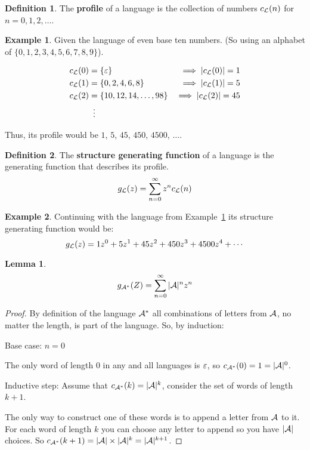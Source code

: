 \documentclass[a4paper]{article}
\newtheorem{lemma}{Lemma}[section]
\theoremstyle{definition}
\newtheorem{definition}{Definition}[section]
\theoremstyle{definition}
\newtheorem{example}{Example}[section]
\theoremstyle{definition}
\begin{document}
\begin{definition}
    The \textbf{profile} of a language is the collection of numbers $c_{\mathcal{L}}(n)$ for $n = 0,1,2,\dots$.
\end{definition}

\begin{example}
    \label{exmp:langProf}
    Given the language of even base ten numbers. (So using an alphabet of \(\{0, 1, 2, 3, 4, 5, 6, 7, 8, 9\}\)).
    
    \begin{align*}
        c_{\mathcal{L}}(0) &= \{ \varepsilon \} &\implies |c_{\mathcal{L}}(0)| = 1 \\
        c_{\mathcal{L}}(1) &= \{ 0, 2, 4, 6, 8 \} &\implies |c_{\mathcal{L}}(1)| = 5 \\
        c_{\mathcal{L}}(2) &= \{ 10, 12, 14, \dots, 98 \} &\implies |c_{\mathcal{L}}(2)| = 45 \\
        &~\,\vdots
    \end{align*}

    Thus, its profile would be \(1\), \(5\), \(45\), \(450\), \(4500\), \(\dots\).
\end{example}

\begin{definition}
    The \textbf{structure generating function} of a language is the generating function that describes its profile.
    \[
    g_{\mathcal{L}}(z) = \sum_{n=0}^\infty z^n c_{\mathcal{L}}(n)
    \]
\end{definition}

\begin{example}
    Continuing with the language from Example~\ref{exmp:langProf} its structure generating function would be:
    \[
    g_{\mathcal{L}}(z) = 1z^0 + 5z^1 + 45z^2 + 450z^3 + 4500z^4 + \cdots
    \]
\end{example}

\begin{lemma}
    \label{lem:genFnAStar}
    \[
    g_{\mathcal{A}^*}(Z) = \sum_{n=0}^\infty |\mathcal{A}|^n z^n
    \]
\end{lemma}
\begin{proof}
    By definition of the language \(\mathcal{A}^*\) all combinations of letters from \(\mathcal{A}\), no matter the length, is part of the language. So, by induction:

    \noindent Base case: \(n = 0\)

    The only word of length \(0\) in any and all languages is \(\varepsilon\), so \(c_{\mathcal{A}^*}(0) = 1 = |\mathcal{A}|^0\).

    \noindent Inductive step: Assume that \(c_{\mathcal{A}^*}(k) = |\mathcal{A}|^k\), consider the set of words of length \(k + 1\).

    The only way to construct one of these words is to append a letter from \(\mathcal{A}\) to it. For each word of length \(k\) you can choose any letter to append so you have \(|\mathcal{A}|\) choices. So \(c_{\mathcal{A}^*}(k + 1) = |\mathcal{A}| \times |\mathcal{A}|^k = |\mathcal{A}|^{k + 1}\).
    
\end{proof}
\end{document}
